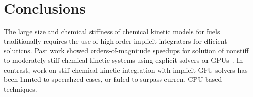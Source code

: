 \documentclass[preprint,review,11pt]{elsarticle}
\begin{document}
\section{Conclusions}
\label{S:conclusions}

The large size and chemical stiffness of chemical kinetic models for fuels traditionally requires the use of high-order implicit integrators for efficient solutions.
Past work showed orders-of-magnitude speedups for solution of nonstiff to moderately stiff chemical kinetic systems using explicit solvers on GPUs~\cite{Niemeyer:2011aa,Le2013596,Niemeyer:2014aa}.
In contrast, work on stiff chemical kinetic integration with implicit GPU solvers has been limited to specialized cases, or failed to surpass current CPU-based techniques.
\end{document}
